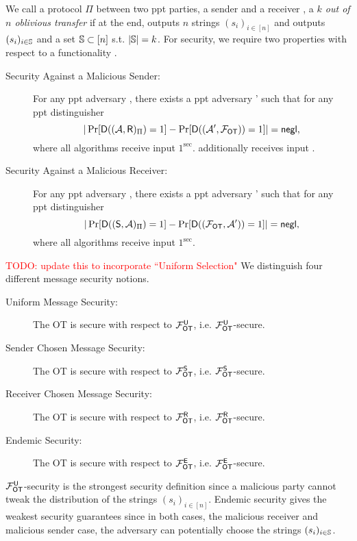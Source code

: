 \begin{definition}\label{def:otSec}
We call a protocol $\Pi$ between two ppt parties, a sender \send and a receiver \rec, a \emph{$k$ out of $n$ oblivious transfer} if %
at the end, \send outputs $n$ strings $(s_i)_{i\in[n]}$ and \rec outputs $(s_i)_{i\in\mathsf{\mathbb S}}$ and a set $\mathsf{\mathbb S}\subset[n]$ s.t. $|\mathsf{\mathbb S}|=k$. For security, we require two properties with respect to a functionality \OOT.
\begin{description}
\item[Security Against a Malicious Sender:] For any ppt adversary \Adv, there exists a ppt adversary \Adv' such that for any ppt distinguisher \D
$$
|\Pr[\mathsf D((\mathcal{A},\mathsf{R})_{\Pi})=1] -\Pr[\mathsf D( (\mathcal{A}', \mathcal{F}_{\mathsf{OT}}))=1]|=\mathsf{negl},
$$
where all algorithms receive input $1^\sec$. \rec additionally receives input \set.
\item[Security Against a Malicious Receiver:] For any ppt adversary \Adv, there exists a ppt adversary \Adv' such that for any ppt distinguisher \D
$$
|\Pr[\mathsf D((\mathsf{S}, \mathcal{A})_{\Pi})=1] -\Pr[\mathsf D((\mathcal{F}_{\mathsf{OT}},\mathcal{A}'))=1]|=\mathsf{negl},
$$
where all algorithms receive input $1^\sec$.
\end{description}


\textcolor{red}{TODO: update this to incorporate ``Uniform Selection"} We distinguish four different message security notions.
\begin{description}
\item[Uniform Message Security:] The OT is secure with respect to $\mathcal{F}_{\mathsf{OT}}^\mathsf{U}$, i.e. $\mathcal{F}_{\mathsf{OT}}^\mathsf{U}$-secure.
\item[Sender Chosen Message Security:] The OT is secure with respect to $\mathcal{F}_{\mathsf{OT}}^{\mathsf{S}}$, i.e. $\mathcal{F}_{\mathsf{OT}}^{\mathsf{S}}$-secure.
\item[Receiver Chosen Message Security:] The OT is secure with respect to $\mathcal{F}_{\mathsf{OT}}^{\mathsf{R}}$, i.e. $\mathcal{F}_{\mathsf{OT}}^{\mathsf{R}}$-secure.
\item[Endemic Security:] The OT is secure with respect to $\mathcal{F}_{\mathsf{OT}}^{\mathsf{E}}$, i.e. $\mathcal{F}_{\mathsf{OT}}^{\mathsf{E}}$-secure.
\end{description}


\end{definition}

\begin{remark}
$\mathcal{F}_{\mathsf{OT}}^\mathsf{U}$-security is the strongest security definition since a malicious party cannot tweak the distribution of the strings  $(s_i)_{i\in[n]}$. Endemic security gives the weakest security guarantees since in both cases, the malicious receiver and malicious sender case, the adversary can potentially choose the strings $(s_i)_{i\in\mathsf{\mathbb S}}$.
\end{remark}


